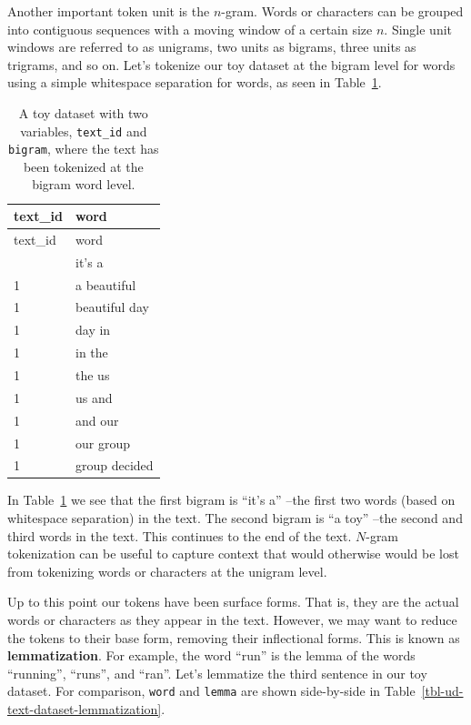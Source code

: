 \documentclass[
  letterpaper,
  DIV=11,
  numbers=noendperiod]{scrreport}
\theoremstyle{definition}
\theoremstyle{remark}
\begin{document}
Another important token unit is the \(n\)-gram. Words or characters can
be grouped into contiguous sequences with a moving window of a certain
size \(n\). Single unit windows are referred to as unigrams, two units
as bigrams, three units as trigrams, and so on. Let's tokenize our toy
dataset at the bigram level for words using a simple whitespace
separation for words, as seen in Table~\ref{tbl-ud-text-dataset-bigram}.

\hypertarget{tbl-ud-text-dataset-bigram}{}
\begin{longtable}[]{@{}ll@{}}
\caption{\label{tbl-ud-text-dataset-bigram}A toy dataset with two
variables, \texttt{text\_id} and \texttt{bigram}, where the text has
been tokenized at the bigram word level.}\tabularnewline
\toprule\noalign{}
text\_id & word \\
\midrule\noalign{}
\endfirsthead
\toprule\noalign{}
text\_id & word \\
\midrule\noalign{}
\endhead
\bottomrule\noalign{}
\endlastfoot
1 & it's a \\
1 & a beautiful \\
1 & beautiful day \\
1 & day in \\
1 & in the \\
1 & the us \\
1 & us and \\
1 & and our \\
1 & our group \\
1 & group decided \\
\end{longtable}

In Table~\ref{tbl-ud-text-dataset-bigram} we see that the first bigram
is ``it's a'' --the first two words (based on whitespace separation) in
the text. The second bigram is ``a toy'' --the second and third words in
the text. This continues to the end of the text. \(N\)-gram tokenization
can be useful to capture context that would otherwise would be lost from
tokenizing words or characters at the unigram level.

Up to this point our tokens have been surface forms. That is, they are
the actual words or characters as they appear in the text. However, we
may want to reduce the tokens to their base form, removing their
inflectional forms. This is known as \textbf{lemmatization}. For
example, the word ``run'' is the lemma of the words ``running'',
``runs'', and ``ran''. Let's lemmatize the third sentence in our toy
dataset. For comparison, \texttt{word} and \texttt{lemma} are shown
side-by-side in Table~\ref{tbl-ud-text-dataset-lemmatization}.
\end{document}
